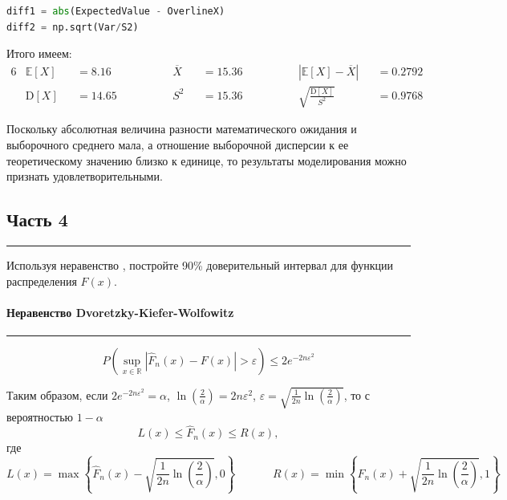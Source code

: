 \documentclass[a4paper, 14pt]{extarticle}
\begin{document}
\begin{center}
  \begin{lstlisting}[language=Python]
diff1 = abs(ExpectedValue - OverlineX)
diff2 = np.sqrt(Var/S2)
  \end{lstlisting}
\end{center}
\vspace{10pt}

Итого имеем:
\begin{alignat*}{6}
  & \mathbb{E}[X] &&= 8.16 &\hspace{50pt} \overline{X} &&= 15.36 &\hspace{50pt} \left| \mathbb{E}[X] - \overline{X} \right| &&= 0.2792 \\
  & \text{D}[X] &&= 14.65 &\hspace{50pt} S^2 &&= 15.36 &\hspace{50pt} \sqrt{\frac{\text{D}[X]}{S^2}} &&= 0.9768
\end{alignat*}

Поскольку абсолютная величина разности математического ожидания 
и выборочного среднего мала, а отношение выборочной 
дисперсии к ее теоретическому значению близко к единице, то 
результаты моделирования можно признать удовлетворительными.

\subsection{Часть 4}\vspace{-20pt}\rule{\linewidth}{0.1mm}

Используя неравенство , 
постройте 90\% доверительный интервал для функции распределения $F(x)$.

\paragraph{Неравенство Dvoretzky-Kiefer-Wolfowitz}\vspace{-20pt}\rule{\linewidth}{0.1mm}

\begin{equation*}
  P \left( \sup_{x \in \mathbb{R}} \left| \hat{F}_n(x) - F(x) \right| > \varepsilon \right) 
  \leq 2 e^{-2 n \varepsilon^2}
\end{equation*}

Таким образом, если $2 e^{-2 n \varepsilon^2} = \alpha$, $\ln(\frac{2}{\alpha}) = 
2 n \varepsilon^2$, $\varepsilon = \sqrt{\frac{1}{2 n} \ln(\frac{2}{\alpha})}$, то 
с вероятностью $1 - \alpha$
\begin{equation*}
  L(x) \leq \hat{F}_n(x) \leq R(x),
\end{equation*}
где
\begin{equation*}
  L(x) = \max \left\{ \hat{F}_n (x) - \sqrt{\frac{1}{2 n} \ln\left(\frac{2}{\alpha}\right)}, 0 \right\} 
  \hspace{40pt} 
  R(x) = \min \left\{ \hat{F}_n (x) + \sqrt{\frac{1}{2 n} \ln\left(\frac{2}{\alpha}\right)}, 1 \right\}
\end{equation*}
\end{document}
